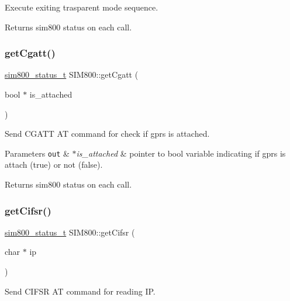 Execute exiting trasparent mode sequence. 

\begin{DoxyReturn}{Returns}
sim800 status on each call. 
\end{DoxyReturn}
\mbox{\label{classSIM800_a01c081285a1c61b068f97f06fb2004d9}} 
\subsubsection{\texorpdfstring{get\+Cgatt()}{getCgatt()}}
{\footnotesize\ttfamily \hyperlink{sim800_8h_a3d1eeaa095df003ea28385b81a134b27}{sim800\+\_\+status\+\_\+t} S\+I\+M800\+::get\+Cgatt (\begin{DoxyParamCaption}\item[{bool $\ast$}]{is\+\_\+attached }\end{DoxyParamCaption})}



Send C\+G\+A\+TT AT command for check if gprs is attached. 


\begin{DoxyParams}[1]{Parameters}
\mbox{\tt out}  & {\em $\ast$is\+\_\+attached} & pointer to bool variable indicating if gprs is attach (true) or not (false). \\
\hline
\end{DoxyParams}
\begin{DoxyReturn}{Returns}
sim800 status on each call. 
\end{DoxyReturn}
\mbox{\label{classSIM800_a5313d75fb7510fe8b84b89def3b35096}} 
\subsubsection{\texorpdfstring{get\+Cifsr()}{getCifsr()}}
{\footnotesize\ttfamily \hyperlink{sim800_8h_a3d1eeaa095df003ea28385b81a134b27}{sim800\+\_\+status\+\_\+t} S\+I\+M800\+::get\+Cifsr (\begin{DoxyParamCaption}\item[{char $\ast$}]{ip }\end{DoxyParamCaption})}



Send C\+I\+F\+SR AT command for reading IP. 


